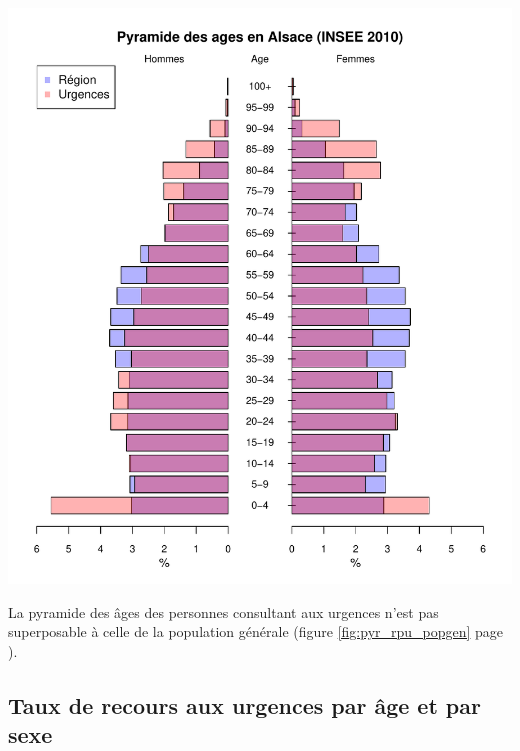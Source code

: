 \documentclass[12pt,english,french,twoside]{book}\usepackage[]{graphicx}\usepackage[]{color}
\makeatletter
\def\maxwidth{ %
  \ifdim\Gin@nat@width>\linewidth
    \linewidth
  \else
    \Gin@nat@width
  \fi
}
\newenvironment{knitrout}{}{} %
\makeatother
\begin{document}
\begin{center}
\begin{knitrout}
\color{fgcolor}
\includegraphics[width=\maxwidth]{figure/comp_pyramides} 

\end{knitrout}

\label{fig:pyr_rpu_popgen}
\end{center}


La pyramide des âges des personnes consultant aux urgences n'est pas superposable à celle de la population générale (figure \ref{fig:pyr_rpu_popgen} page \pageref{fig:pyr_rpu_popgen}). 


\subsection*{Taux de recours aux urgences par âge et par sexe}
\end{document}

